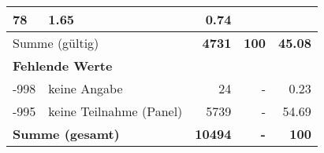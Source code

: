 \begin{longtable}{lXrrr}
       \num{78} &
       \num[round-mode=places,round-precision=2]{1,65} &
         \num[round-mode=places,round-precision=2]{0,74} \\
     \midrule
     \multicolumn{2}{l}{Summe (gültig)} &
       \textbf{\num{4731}} &
     \textbf{100} &
       \textbf{\num[round-mode=places,round-precision=2]{45,08}} \\
     \multicolumn{5}{l}{\textbf{Fehlende Werte}}\\
       -998 &
       keine Angabe &
         \num{24} &
        - &
         \num[round-mode=places,round-precision=2]{0,23} \\
       -995 &
       keine Teilnahme (Panel) &
         \num{5739} &
        - &
         \num[round-mode=places,round-precision=2]{54,69} \\
     \midrule
     \multicolumn{2}{l}{\textbf{Summe (gesamt)}} &
          \textbf{\num{10494}} &
        \textbf{-} &
        \textbf{100} \\
     \bottomrule
     \end{longtable}
     
